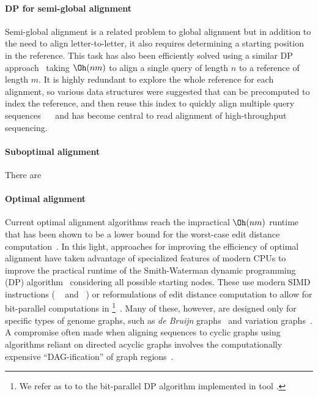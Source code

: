 \paragraph{DP for semi-global alignment}
Semi-global alignment is a related problem to global alignment but in addition
to the need to align letter-to-letter, it also requires determining a starting
position in the reference. This task has also been efficiently solved using a
similar DP approach~\cite{sellers1980theory,smith1981identification} taking
$\Oh(nm)$ to align a single query of length $n$ to a reference of length $m$. It
is highly redundant to explore the whole reference for each alignment, so
various data structures were suggested that can be precomputed to index the
reference, and then reuse this index to quickly align multiple query sequences
~\citeyear{pearson1988improved}~\cite{pearson1988improved} and has become
central to read alignment of high-throughput sequencing.

\paragraph{Suboptimal alignment}
There are 

\paragraph{Optimal alignment}
Current optimal alignment algorithms reach the impractical $\Oh(nm)$ runtime
that has been shown to be a lower bound for the worst-case edit distance
computation~\cite{backurs2015edit}. In this light, approaches for improving the
efficiency of optimal alignment have taken advantage of specialized features of
modern CPUs to improve the practical runtime of the Smith-Waterman dynamic
programming (DP) algorithm~\cite{smith_comparison_1981} considering all possible
starting nodes. These use modern SIMD instructions (\eg
\vg~\cite{garrison_variation_2018} and \pasgal~\cite{jain_accelerating_2019}) or
reformulations of edit distance computation to allow for bit-parallel
computations in \graphaligner \footnote{We refer as \bitparallel to to the
bit-parallel DP algorithm implemented in \graphaligner tool
\cite{rautiainen_bitparallel_2019}.}~\cite{rautiainen_bitparallel_2019}. Many of
these, however, are designed only for specific types of genome graphs, such as
{\itshape de Bruijn}
graphs~\cite{liu_debga_2016,limasset2019toward} and
variation graphs~\cite{garrison_variation_2018}. A compromise often made when
aligning sequences to cyclic graphs using algorithms reliant on directed acyclic
graphs involves the computationally expensive ``DAG-ification'' of graph
regions~\cite{kavya_sequence_2019,garrison_variation_2018}.

